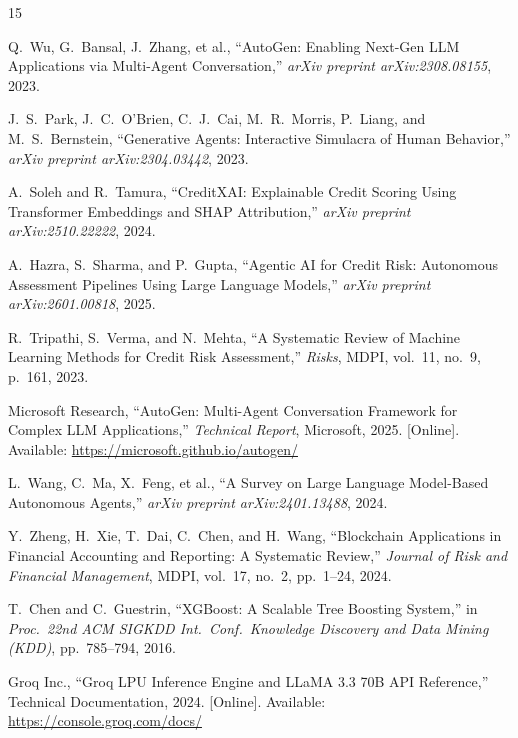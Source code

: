 \documentclass[conference]{IEEEtran}
\begin{document}
\begin{thebibliography}{15}

Q.\ Wu, G.\ Bansal, J.\ Zhang, et al., ``AutoGen: Enabling
Next-Gen LLM Applications via Multi-Agent Conversation,''
\textit{arXiv preprint arXiv:2308.08155}, 2023.

J.\ S.\ Park, J.\ C.\ O'Brien, C.\ J.\ Cai, M.\ R.\ Morris,
P.\ Liang, and M.\ S.\ Bernstein, ``Generative Agents:
Interactive Simulacra of Human Behavior,''
\textit{arXiv preprint arXiv:2304.03442}, 2023.

A.\ Soleh and R.\ Tamura, ``CreditXAI: Explainable Credit
Scoring Using Transformer Embeddings and SHAP Attribution,''
\textit{arXiv preprint arXiv:2510.22222}, 2024.

A.\ Hazra, S.\ Sharma, and P.\ Gupta, ``Agentic AI for
Credit Risk: Autonomous Assessment Pipelines Using Large
Language Models,'' \textit{arXiv preprint arXiv:2601.00818},
2025.

R.\ Tripathi, S.\ Verma, and N.\ Mehta, ``A Systematic
Review of Machine Learning Methods for Credit Risk
Assessment,'' \textit{Risks}, MDPI, vol.\ 11, no.\ 9,
p.\ 161, 2023.

Microsoft Research, ``AutoGen: Multi-Agent Conversation
Framework for Complex LLM Applications,''
\textit{Technical Report}, Microsoft, 2025.
[Online]. Available: \url{https://microsoft.github.io/autogen/}

L.\ Wang, C.\ Ma, X.\ Feng, et al., ``A Survey on Large
Language Model-Based Autonomous Agents,''
\textit{arXiv preprint arXiv:2401.13488}, 2024.

Y.\ Zheng, H.\ Xie, T.\ Dai, C.\ Chen, and H.\ Wang,
``Blockchain Applications in Financial Accounting and
Reporting: A Systematic Review,''
\textit{Journal of Risk and Financial Management}, MDPI,
vol.\ 17, no.\ 2, pp.\ 1--24, 2024.

T.\ Chen and C.\ Guestrin, ``XGBoost: A Scalable Tree
Boosting System,'' in \textit{Proc.\ 22nd ACM SIGKDD
Int.\ Conf.\ Knowledge Discovery and Data Mining (KDD)},
pp.\ 785--794, 2016.

Groq Inc., ``Groq LPU Inference Engine and LLaMA 3.3 70B
API Reference,'' Technical Documentation, 2024.
[Online]. Available: \url{https://console.groq.com/docs/}


\end{thebibliography}
\end{document}

